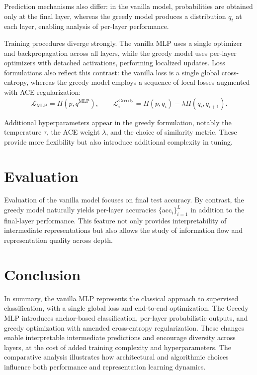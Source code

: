 \documentclass[11pt]{article}
\begin{document}
Prediction mechanisms also differ: in the vanilla model, probabilities are obtained only at the final layer, whereas the greedy model produces a distribution $q_i$ at each layer, enabling analysis of per-layer performance.

Training procedures diverge strongly. The vanilla MLP uses a single optimizer and backpropagation across all layers, while the greedy model uses per-layer optimizers with detached activations, performing localized updates. Loss formulations also reflect this contrast: the vanilla loss is a single global cross-entropy, whereas the greedy model employs a sequence of local losses augmented with ACE regularization:
\[
  \mathcal{L}_{\text{MLP}} = H(p, q^{\text{MLP}}), \qquad
  \mathcal{L}_i^{\text{Greedy}} = H(p, q_i) - \lambda H(q_i, q_{i+1}).
\]

Additional hyperparameters appear in the greedy formulation, notably the temperature $\tau$, the ACE weight $\lambda$, and the choice of similarity metric. These provide more flexibility but also introduce additional complexity in tuning.

\section{Evaluation}
Evaluation of the vanilla model focuses on final test accuracy. By contrast, the greedy model naturally yields per-layer accuracies $\{\mathrm{acc}_i\}_{i=1}^L$ in addition to the final-layer performance. This feature not only provides interpretability of intermediate representations but also allows the study of information flow and representation quality across depth.

\section{Conclusion}
In summary, the vanilla MLP represents the classical approach to supervised classification, with a single global loss and end-to-end optimization. The Greedy MLP introduces anchor-based classification, per-layer probabilistic outputs, and greedy optimization with amended cross-entropy regularization. These changes enable interpretable intermediate predictions and encourage diversity across layers, at the cost of added training complexity and hyperparameters. The comparative analysis illustrates how architectural and algorithmic choices influence both performance and representation learning dynamics.
\end{document}
